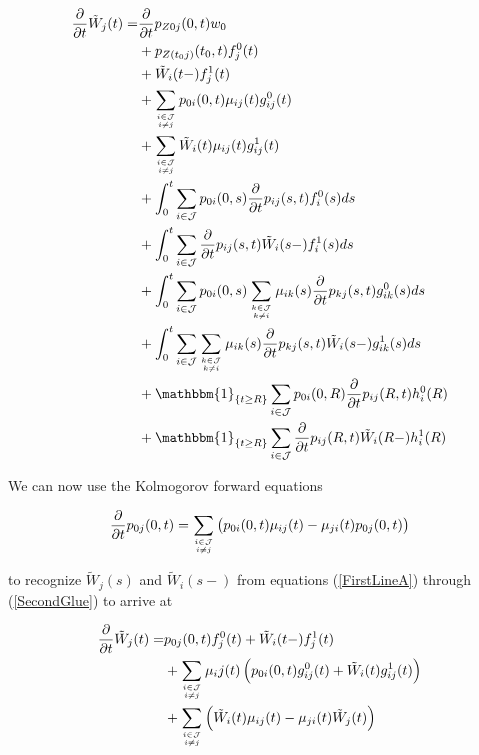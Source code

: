 \documentclass{article}
\newcommand{\1}[1]{\mathbbm{1}_{\left\lbrace #1 \right\rbrace}}
\theoremstyle{break}
\theoremstyle{remark}
\numberwithin{equation}{section}
\begin{document}
\begin{appendices}
\begin{align*}
\frac{\partial}{\partial t} \tilde{W}_j(t) =& \frac{\partial}{\partial t} p_{Z0j}(0,t) w_0 \\
&+ p_{Z(t_0j)}(t_0,t) f_j^0(t) \\
&+ \tilde{W}_i(t-) f_j^1(t) \\
&+ \sum_{i \in \mathcal{J} \atop i \neq j} p_{0i}(0,t) \mu_{ij}(t) g_{ij}^0(t) \\
&+ \sum_{i \in \mathcal{J} \atop i \neq j} \tilde{W}_i(t) \mu_{ij}(t) g_{ij}^1(t) \\
&+ \int_0^t \sum_{i \in \mathcal{J}} p_{0i}(0,s) \frac{\partial}{\partial t} p_{ij}(s,t) f_i^0(s) ds \\
&+ \int_0^t \sum_{i \in \mathcal{J}} \frac{\partial}{\partial t} p_{ij}(s,t) \tilde{W}_i(s-) f_i^1(s) ds \\
&+ \int_0^t \sum_{i \in \mathcal{J}} p_{0i}(0,s) \sum_{k \in \mathcal{J} \atop k \neq i} \mu_{ik}(s) \frac{\partial}{\partial t} p_{kj}(s,t) g_{ik}^0(s) ds \\
&+ \int_0^t \sum_{i \in \mathcal{J}} \sum_{k \in \mathcal{J} \atop k \neq i} \mu_{ik}(s) \frac{\partial}{\partial t} p_{kj}(s,t) \tilde{W}_i(s-) g_{ik}^1(s) ds \\
&+ \1{t \geq R}\sum_{i \in \mathcal{J}} p_{0i}(0,R) \frac{\partial}{\partial t} p_{ij}(R,t) h_i^0(R) \\
&+ \1{t \geq R}\sum_{i \in \mathcal{J}} \frac{\partial}{\partial t} p_{ij}(R,t) \tilde{W}_i(R-) h_i^1(R)
\end{align*}

We can now use the Kolmogorov forward equations

\begin{align*}
\frac{\partial}{\partial t} p_{0j}(0,t) = \sum_{i \in \mathcal{J} \atop i \neq j} \left( p_{0i}(0,t) \mu_{ij}(t) - \mu_{ji}(t) p_{0j}(0,t) \right)
\end{align*}

to recognize $\tilde{W}_j(s)$ and $\tilde{W}_i(s-)$ from equations (\ref{FirstLineA}) through (\ref{SecondGlue}) to arrive at

\begin{align*}
	\frac{\partial}{\partial t} \tilde{W}_j(t) =& p_{0j}(0,t) f_j^0(t) + \tilde{W}_i(t-) f_j^1(t) \\
	&+ \sum_{i \in \mathcal{J} \atop i \neq j} \mu_ij(t) \left( p_{0i}(0,t) g_{ij}^0(t) + \tilde{W}_i(t) g_{ij}^1(t) \right) \\
	&+ \sum_{i \in \mathcal{J} \atop i \neq j} \left( \tilde{W}_i(t) \mu_{ij}(t) - \mu_{ji}(t) \tilde{W}_j(t) \right)
\end{align*}


\end{appendices}
\end{document}
